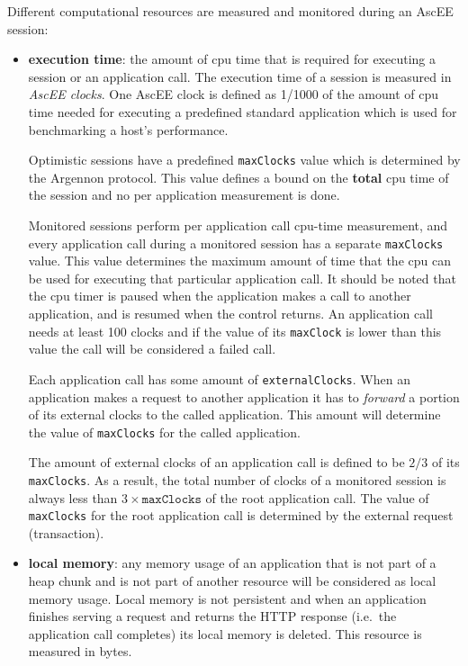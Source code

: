 Different computational resources are measured and monitored during an AscEE session:
\begin{itemize}
    \item \textbf{execution time}:
    the amount of cpu time that is required for executing a session or an application call. The execution time of a
    session is measured in \emph{AscEE clocks}. One AscEE clock is defined as 1/1000 of the amount
    of cpu time needed for executing a predefined standard application which is used for benchmarking a host's
    performance.

    Optimistic sessions have a predefined \texttt{maxClocks} value which is determined by the Argennon protocol. This
    value defines a bound on the \textbf{total} cpu time of the session and no per application measurement is done.

    Monitored sessions perform per application call cpu-time measurement, and every application call during a monitored
    session has a separate \texttt{maxClocks} value. This value determines the maximum amount of time that the cpu
    can be used for executing that particular application call. It should be noted that the cpu timer is paused when
    the application makes a call to another application, and is resumed when the control returns. An application call
    needs at least 100 clocks and if the value of its \texttt{maxClock} is lower than this value the call will be
    considered a failed call.

    Each application call has some amount of \texttt{externalClocks}. When an application makes a request to another
    application it has to \emph{forward} a portion of its external clocks to the called application. This amount
    will determine the value of \texttt{maxClocks} for the called application.

    The amount of external clocks of an application
    call is defined to be \(2/3\) of its \texttt{maxClocks}. As a result, the total number of clocks of a monitored
    session is always less than \(3 \times \texttt{maxClocks}\) of the root application call. The value of
    \texttt{maxClocks} for
    the root application call is determined by the external request (transaction).

    \item \textbf{local memory}:
    any memory usage of an application that is not part of a heap chunk and is not part of another resource
    will be considered as local memory usage. Local memory is not persistent and when an application finishes serving a
    request and returns the HTTP response (i.e.\ the application call completes) its local memory is deleted.
    This resource is measured in bytes.


\end{itemize}
